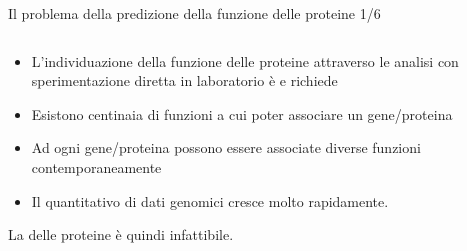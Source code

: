 \documentclass{beamer}
\begin{document}
\begin{tframe}{\small Il problema della predizione della funzione delle proteine 1/6}
  \begin{columns}
    \begin{column}{.75\textwidth}
      \minipage[c][0.4\textheight][s]{\columnwidth}
	   \begin{itemize}	
	  \item L'individuazione della funzione delle proteine attraverso le analisi con sperimentazione diretta in laboratorio è  e richiede 
	  \onslide<2->
	  \item Esistono centinaia di funzioni a cui poter associare un gene/proteina 
	  \onslide<3->
	  \item Ad ogni gene/proteina possono essere associate diverse funzioni contemporaneamente 
	  \item Il quantitativo di dati genomici cresce molto rapidamente.
      \end{itemize}
      La  delle proteine è quindi infattibile.
      \endminipage      
    \end{column}
    \begin{column}{.25\textwidth}



    \end{column}
  \end{columns}

\end{tframe}
\end{document}
